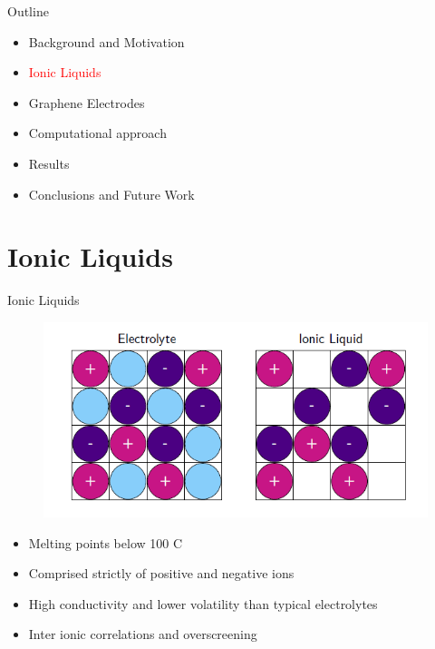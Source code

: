 \documentclass{beamer}
\begin{document}
\begin{frame}{Outline}

\begin{itemize}
\item Background and Motivation\\
\item \textcolor{red}{Ionic Liquids}\\
\item Graphene Electrodes\\
\item Computational approach \\
\item Results \\
\item Conclusions and Future Work
\end{itemize}
\end{frame}

\section{Ionic Liquids}
\begin{frame}{Ionic Liquids}
    \begin{center}
        \begin{figure}
            \centering
            \includegraphics[scale=0.5]{ILs.PNG}
        \end{figure}{}
    \end{center}{}

    \begin{itemize}
        \item Melting points below 100 C
        \item Comprised strictly of positive and negative ions
        \item High conductivity and lower volatility than typical electrolytes
        \item Inter ionic correlations and overscreening 
    \end{itemize}{}
\end{frame}
\end{document}
